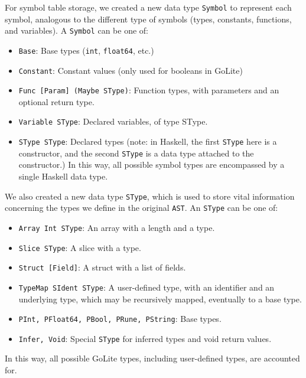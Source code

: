\documentclass[11pt]{article}
\begin{document}
For symbol table storage, we created a new data type \texttt{Symbol}
to represent each symbol, analogous to the different type of symbols
(types, constants, functions, and variables). A \texttt{Symbol} can be
one of:
\begin{itemize}
\item \texttt{Base}: Base types (\texttt{int}, \texttt{float64}, etc.)
\item \texttt{Constant}: Constant values (only used for booleans in
  GoLite)
\item \texttt{Func [Param] (Maybe SType)}: Function types, with
  parameters and an optional return type.
\item \texttt{Variable SType}: Declared variables, of type SType.
\item \texttt{SType SType}: Declared types (note: in Haskell, the
  first \texttt{SType} here is a constructor, and the second
  \texttt{SType} is a data type attached to the constructor.)  In this
  way, all possible symbol types are encompassed by a single Haskell
  data type.
\end{itemize}

We also created a new data type \texttt{SType}, which is used to store
vital information concerning the types we define in the original
\texttt{AST}.  An \texttt{SType} can be one of:
\begin{itemize}
\item \texttt{Array Int SType}: An array with a length and a type.
\item \texttt{Slice SType}: A slice with a type.
\item \texttt{Struct [Field]}: A struct with a list of fields.
\item \texttt{TypeMap SIdent SType}: A user-defined type, with an
  identifier and an underlying type, which may be recursively mapped,
  eventually to a base type.
\item \texttt{PInt, PFloat64, PBool, PRune, PString}: Base types.
\item \texttt{Infer, Void}: Special
  \texttt{SType} for inferred types and void
  return values.
\end{itemize}
In this way, all possible GoLite types, including user-defined types,
are accounted for.
\end{document}

